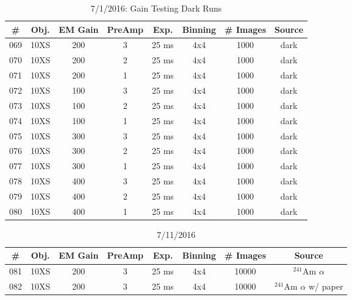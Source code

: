 \documentclass[12pt]{amsart}
\begin{document}
\begin{table}[!htbp]
	\centering
	\caption{7/1/2016: Gain Testing Dark Runs}
	\label{tab:table12}
	\hspace*{-1cm}
	\begin{tabular}{cccccccc}
	\toprule
	\# & Obj. & EM Gain & PreAmp & Exp. & Binning & \# Images & Source\\
	\midrule
	069 & 10XS & 200 & 3 & 25 ms & 4x4 & 1000 & dark\\
	070 & 10XS & 200 & 2 & 25 ms & 4x4 & 1000 & dark\\
	071 & 10XS & 200 & 1 & 25 ms & 4x4 & 1000 & dark\\
	072 & 10XS & 100 & 3 & 25 ms & 4x4 & 1000 & dark\\
	073 & 10XS & 100 & 2 & 25 ms & 4x4 & 1000 & dark\\
	074 & 10XS & 100 & 1 & 25 ms & 4x4 & 1000 & dark\\
	075 & 10XS & 300 & 3 & 25 ms & 4x4 & 1000 & dark\\
	076 & 10XS & 300 & 2 & 25 ms & 4x4 & 1000 & dark\\
	077 & 10XS & 300 & 1 & 25 ms & 4x4 & 1000 & dark\\
	078 & 10XS & 400 & 3 & 25 ms & 4x4 & 1000 & dark\\
	079 & 10XS & 400 & 2 & 25 ms & 4x4 & 1000 & dark\\
	080 & 10XS & 400 & 1 & 25 ms & 4x4 & 1000 & dark\\
	\bottomrule
	\end{tabular}
	\hspace*{-1cm}
\end{table}

\begin{table}[!htbp]
	\centering
	\caption{7/11/2016}
	\label{tab:table13}
	\hspace*{-1cm}
	\begin{tabular}{cccccccc}
	\toprule
	\# & Obj. & EM Gain & PreAmp & Exp. & Binning & \# Images & Source\\
	\midrule
	081 & 10XS & 200 & 3 & 25 ms & 4x4 & 10000 & $^{241}$Am $\alpha$\\
	082 & 10XS & 200 & 3 & 25 ms & 4x4 & 10000 & $^{241}$Am $\alpha$ w/ paper\\
	\bottomrule
	\end{tabular}
	\hspace*{-1cm}
\end{table}
\end{document}
